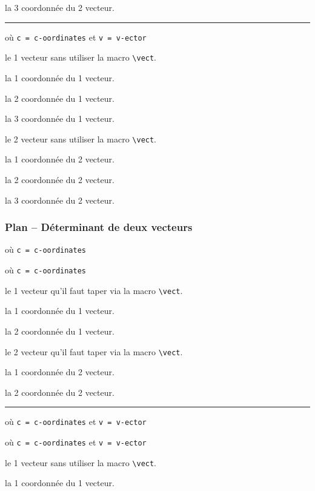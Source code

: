 \documentclass[12pt,a4paper]{article}
\newcommand\env[1]{\texttt{#1}}
\newcommand\macro[1]{\env{\textbackslash{}#1}}
\theoremstyle{definition}
\newcommand\separation{
	\medskip
	\hfill\rule{0.5\textwidth}{0.75pt}\hfill
	\medskip
}
\begin{document}
 la 3\ieme{} coordonnée du 2\ieme{} vecteur.


\separation


 où \quad \verb+c = c-oordinates+ 
                                et \verb+v = v-ector+

 le 1\ier{} vecteur sans utiliser la macro \macro{vect}.

 la 1\iere{} coordonnée du 1\ier{} vecteur.

 la 2\ieme{} coordonnée du 1\ier{} vecteur.

 la 3\ieme{} coordonnée du 1\ier{} vecteur.

 le 2\ieme{} vecteur sans utiliser la macro \macro{vect}.

 la 1\iere{} coordonnée du 2\ieme{} vecteur.

 la 2\ieme{} coordonnée du 2\ieme{} vecteur.

 la 3\ieme{} coordonnée du 2\ieme{} vecteur.
\subsubsection{Plan -- Déterminant de deux vecteurs}

  où \quad \verb+c = c-oordinates+

 où \quad \verb+c = c-oordinates+


 le 1\ier{} vecteur qu'il faut taper via la macro \macro{vect}.

 la 1\iere{} coordonnée du 1\ier{} vecteur.

 la 2\ieme{} coordonnée du 1\ier{} vecteur.

 le 2\ieme{} vecteur qu'il faut taper via la macro \macro{vect}.

 la 1\iere{} coordonnée du 2\ieme{} vecteur.

 la 2\ieme{} coordonnée du 2\ieme{} vecteur.


\separation


  où \quad \verb+c = c-oordinates+ 
                                et \verb+v = v-ector+

 où \quad \verb+c = c-oordinates+ 
                                et \verb+v = v-ector+


 le 1\ier{} vecteur sans utiliser la macro \macro{vect}.

 la 1\iere{} coordonnée du 1\ier{} vecteur.
\end{document}
